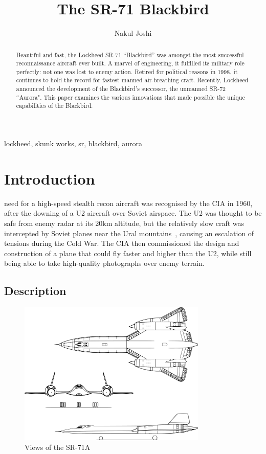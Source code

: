 \documentclass[12pt, draftclsnofoot, onecolumn]{IEEEtran}
\title{The SR-71 Blackbird}
\author{Nakul Joshi}
\begin{document}
\maketitle

\begin{abstract}
	Beautiful and fast, the Lockheed SR-71 ``Blackbird'' was amongst the most successful reconnaissance aircraft ever built. A marvel of engineering, it fulfilled its military role perfectly: not one was lost to enemy action. Retired for political reasons in 1998, it continues to hold the record for fastest manned air-breathing craft. Recently, Lockheed announced the development of the Blackbird's successor, the unmanned SR-72 ``Aurora". This paper examines the various innovations that made possible the unique capabilities of the Blackbird.
\end{abstract}

\begin{IEEEkeywords} lockheed, skunk works, sr, blackbird, aurora \end{IEEEkeywords}



\section{Introduction}

	 need for a high-speed stealth recon aircraft was recognised by the CIA in 1960, after the downing of a U2 aircraft over Soviet airspace. The U2 was thought to be safe from enemy radar at its 20km altitude, but the relatively slow craft was intercepted by Soviet planes near the Ural mountains~\cite{u2}, causing an escalation of tensions during the Cold War. The CIA then commissioned the design and construction of a plane that could fly faster and higher than the U2, while still being able to take high-quality photographs over enemy terrain.	
	
	\subsection{Description}

	\begin{figure}[h]
		\centering
		\includegraphics[width=0.8\textwidth]{view.pdf}
		\caption{Views of the SR-71A}
	\end{figure}
\end{document}
